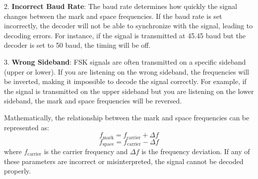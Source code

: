 2. \textbf{Incorrect Baud Rate}: The baud rate determines how quickly the signal changes between the mark and space frequencies. If the baud rate is set incorrectly, the decoder will not be able to synchronize with the signal, leading to decoding errors. For instance, if the signal is transmitted at 45.45 baud but the decoder is set to 50 baud, the timing will be off.

3. \textbf{Wrong Sideband}: FSK signals are often transmitted on a specific sideband (upper or lower). If you are listening on the wrong sideband, the frequencies will be inverted, making it impossible to decode the signal correctly. For example, if the signal is transmitted on the upper sideband but you are listening on the lower sideband, the mark and space frequencies will be reversed.

Mathematically, the relationship between the mark and space frequencies can be represented as:
\[
f_{\text{mark}} = f_{\text{carrier}} + \Delta f
\]
\[
f_{\text{space}} = f_{\text{carrier}} - \Delta f
\]
where \( f_{\text{carrier}} \) is the carrier frequency and \( \Delta f \) is the frequency deviation. If any of these parameters are incorrect or misinterpreted, the signal cannot be decoded properly.

